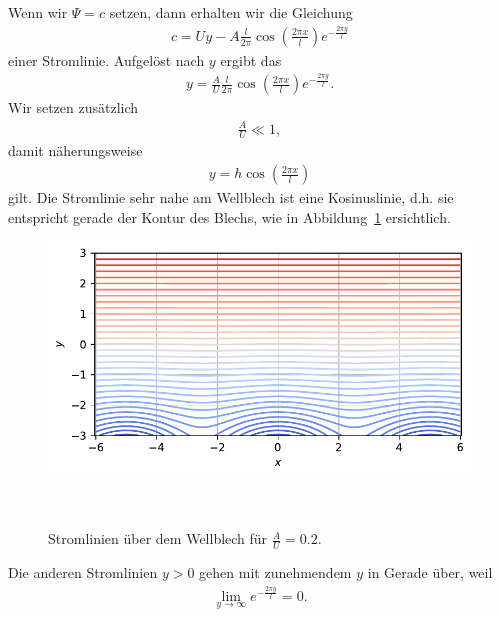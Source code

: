Wenn wir $\Psi = c$ setzen, dann erhalten wir die Gleichung
\begin{align}
    c = U y - A \frac{l}{2 \pi} 
    \cos\left(\frac{2 \pi x}{l}\right) 
    e^{-\frac{2 \pi y}{l}}\label{eq:stromlinie}
\end{align}
einer Stromlinie.
%
Aufgelöst nach $y$ ergibt das
\begin{align*}
    y
    =
    \frac{A}{U} \frac{l}{2 \pi} 
    \cos\left(\frac{2 \pi x}{l}\right) 
    e^{-\frac{2 \pi y}{l}}.
\end{align*}
Wir setzen zusätzlich 
\begin{align*}
    \frac{A}{U} \ll 1,
\end{align*}
damit näherungsweise
\begin{align*}
    y
    =
    h \cos\left(\frac{2 \pi x}{l}\right)
\end{align*}
gilt.
Die Stromlinie sehr nahe am Wellblech ist eine
%
Kosinuslinie, d.h. sie entspricht gerade der Kontur
des Blechs, wie in Abbildung~\ref{fig:stromlinien} ersichtlich.
\begin{figure}
    \centering
    \includegraphics[width=\textwidth]{papers/ueberschall/figures/Stromlinien.pdf}
    \caption{Stromlinien über dem Wellblech für $\frac{A}{U}=0.2$.}
    ~\label{fig:stromlinien}  
\end{figure}
Die anderen Stromlinien $y > 0$ gehen mit zunehmendem $y$
in Gerade über, weil
\begin{align*}
    \lim_{y \to \infty}
    e^{-\frac{2 \pi y}{l}}
    =
    0.
\end{align*}

